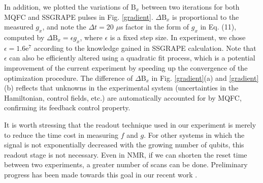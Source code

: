 \documentclass[twocolumn,reprint, amsmath,amssymb,showpacs,superscriptaddress]{revtex4-1}
\begin{document}
In addition, we plotted the variations of $\text{B}_x$ between two iterations for both MQFC and SSGRAPE pulses in Fig. \ref{gradient}. $\Delta \text{B}_x$ is proportional to the measured $g_x$, and note the $\Delta t = 20$ $\mu$s factor in the form of $g_x$ in Eq. (11), computed by $\Delta \text{B}_x = \epsilon g_x$, where $\epsilon$ is a fixed step size. In experiment, we chose $\epsilon = 1.6\text{e}^7$ according to the knowledge gained in SSGRAPE calculation. Note that $\epsilon$ can also be efficiently altered using a quadratic fit process, which is a potential improvement of the current experiment by speeding up the convergence of the optimization procedure. The difference of $\Delta \text{B}_x$ in Fig. \ref{gradient}(a) and \ref{gradient}(b) reflects that unknowns in the experimental system (uncertainties in the Hamiltonian, control fields, etc.) are automatically accounted for by MQFC, confirming its feedback control property.

It is worth stressing that the readout technique used in our experiment is merely to reduce the time cost in measuring $f$ and $g$. For other systems in which the signal is not exponentially decreased with the growing number of qubits, this readout stage is not necessary. Even in NMR, if we can shorten the reset time between two experiments, a greater number of scans can be done. Preliminary progress has been made towards this goal in our recent work \cite{li2014approximation}.
\end{document}
